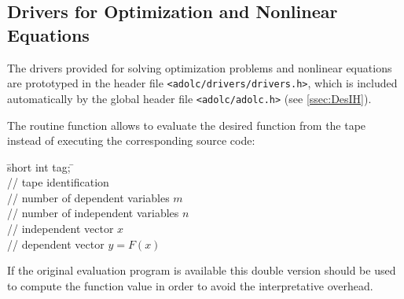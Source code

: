 \documentclass[11pt,twoside]{article}
\begin{document}
\subsection{Drivers for Optimization and Nonlinear Equations}
%
\label{optdrivers}
%
The drivers provided for solving optimization problems and nonlinear
equations are prototyped in the header file \verb=<adolc/drivers/drivers.h>=,
which is included automatically by the global header file \verb=<adolc/adolc.h>=
(see \autoref{ssec:DesIH}). 

The routine {\sf function} allows to evaluate the desired function from 
the tape instead of executing the corresponding source code:
%
\begin{tabbing}
\hspace{0.5in}\={\sf short int tag;} \hspace{1.1in}\= \kill    %
\\
         \> // tape identification \\
                 \> // number of dependent variables $m$\\
                 \> // number of independent variables $n$\\
           \> // independent vector $x$ \\
           \> // dependent vector $y=F(x)$ 
\end{tabbing}
%
If the original evaluation program is available this double version 
should be used to compute the function value in order to avoid the
interpretative overhead.  
\end{document}
